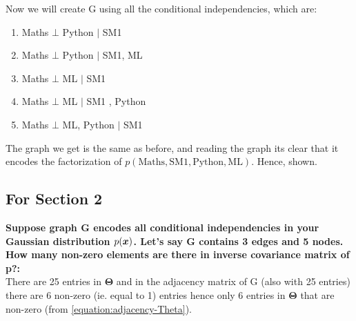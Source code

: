 \begin{appendices}
\begin{question}
    Now we will create G using all the conditional independencies, which are:
    \begin{enumerate}
        \item Maths $\bot$ Python $|$ SM1
        \item Maths $\bot$ Python $|$ SM1, ML 
        \item Maths $\bot$ ML $|$ SM1
        \item Maths $\bot$ ML $|$ SM1 , Python
        \item Maths $\bot$ ML, Python $|$ SM1
    \end{enumerate}
    The graph we get is the same as before, and reading the graph its clear that it encodes the factorization of $p(\text{Maths}, \text{SM}1, \text{Python}, \text{ML})$. Hence, shown.
\end{question}

\subsection{For Section 2}
\begin{question}
    \textbf{Suppose graph G encodes all conditional independencies in your Gaussian distribution $p(\bm{x})$. Let's say G contains 3 edges and 5 nodes. How many non-zero elements are there in inverse covariance matrix of p?:} \\
    There are 25 entries in $\bm{\Theta}$ and in the adjacency matrix of G (also with 25 entries) there are 6 non-zero (ie. equal to 1) entries hence only 6 entries in $\bm{\Theta}$ that are non-zero (from \cref{equation:adjacency-Theta}). 
\end{question}


\end{appendices}
